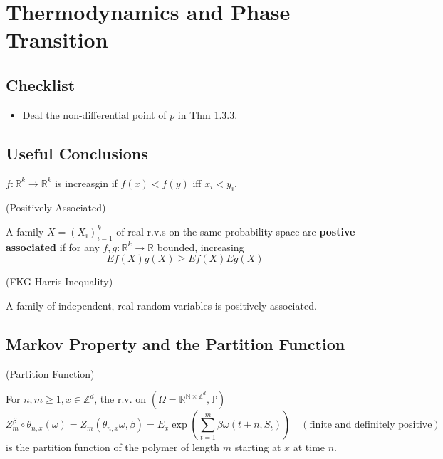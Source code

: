 \section{Thermodynamics and Phase Transition}

\subsection{Checklist}
\begin{itemize}
    \item Deal the non-differential point of $p$ in Thm 1.3.3.
\end{itemize}

\subsection{Useful Conclusions}

\begin{definition}
    $f:\mathbb{R}^k \to \mathbb{R}^k$ is increasgin if $f(x) < f(y)$ iff $x_i < y_i$. 
\end{definition}

\begin{definition}
    (Positively Associated)\par
    A family $X = (X_i)_{i=1}^k$ of real r.v.s on the same probability space are \textbf{postive associated} if for any $f,g:\mathbb{R}^k \to \mathbb{R}$ bounded, increasing
    \[
    Ef(X)g(X) \geq Ef(X) Eg(X)
    \]
\end{definition}

\begin{proposition}
    (FKG-Harris Inequality)\par
    A family of independent, real random variables is positively associated.
\end{proposition}
\subsection{Markov Property and the Partition Function}

\begin{definition}(Partition Function)\par
For $n,m\geq 1, x\in \mathbb{Z}^d$, the r.v. on $(\Omega = \mathbb{R}^{\mathbb{N}\times \mathbb{Z}^d}, \mathbb{P})$
\[
Z_m^{\beta} \circ \theta_{n,x}(\omega) = Z_m(\theta_{n,x}\omega, \beta) = E_x\exp{\left(\sum\limits_{t=1}^m \beta \omega(t+n, S_t)\right)}\quad(\text{finite and definitely positive})\]
is the partition function of the polymer of length $m$ starting at $x$ at time $n$.
\end{definition}

